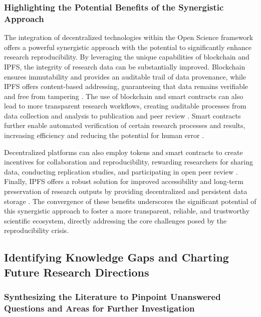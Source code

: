 \documentclass{article}
\begin{document}
\subsubsection{Highlighting the Potential Benefits of the Synergistic Approach}

The integration of decentralized technologies within the Open Science framework offers a powerful synergistic approach with the potential to significantly enhance research reproducibility. By leveraging the unique capabilities of blockchain and IPFS, the integrity of research data can be substantially improved. Blockchain ensures immutability and provides an auditable trail of data provenance, while IPFS offers content-based addressing, guaranteeing that data remains verifiable and free from tampering \cite{benet2014ipfs}. The use of blockchain and smart contracts can also lead to more transparent research workflows, creating auditable processes from data collection and analysis to publication and peer review \cite{author2023blockchain}. Smart contracts further enable automated verification of certain research processes and results, increasing efficiency and reducing the potential for human error \cite{szabo1997formalizing}.

Decentralized platforms can also employ tokens and smart contracts to create incentives for collaboration and reproducibility, rewarding researchers for sharing data, conducting replication studies, and participating in open peer review \cite{szabo1997formalizing}. Finally, IPFS offers a robust solution for improved accessibility and long-term preservation of research outputs by providing decentralized and persistent data storage \cite{benet2014ipfs}. The convergence of these benefits underscores the significant potential of this synergistic approach to foster a more transparent, reliable, and trustworthy scientific ecosystem, directly addressing the core challenges posed by the reproducibility crisis.

\subsection{Identifying Knowledge Gaps and Charting Future Research Directions}

\subsubsection{Synthesizing the Literature to Pinpoint Unanswered Questions and Areas for Further Investigation}
\end{document}
